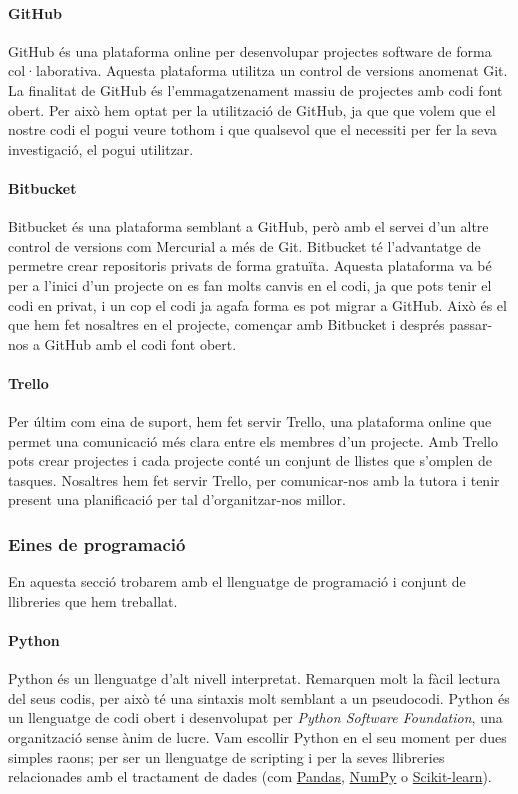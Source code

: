 \documentclass[12pt,a4paper,catalan]{article}
\begin{document}
\paragraph{GitHub}
GitHub és una plataforma online per desenvolupar projectes software de forma col·laborativa. Aquesta plataforma utilitza un control de versions anomenat Git. La finalitat de GitHub és l'emmagatzenament massiu de projectes amb codi font obert. Per això hem optat per la utilització de GitHub, ja que que volem que el nostre codi el pogui veure tothom i que qualsevol que el necessiti per fer la seva investigació, el pogui utilitzar.

\paragraph{Bitbucket}
Bitbucket és una plataforma semblant a GitHub, però amb el servei d'un altre control de versions com Mercurial a més de Git. Bitbucket té l'advantatge de permetre crear repositoris privats de forma gratuïta. Aquesta plataforma va bé per a l'inici d'un projecte on es fan molts canvis en el codi, ja que pots tenir el codi en privat, i un cop el codi ja agafa forma es pot migrar a GitHub. Això és el que hem fet nosaltres en el projecte, començar amb Bitbucket i després passar-nos a GitHub amb el codi font obert.

\paragraph{Trello}
Per últim com eina de suport, hem fet servir Trello, una plataforma online que permet una comunicació més clara entre els membres d'un projecte. Amb Trello pots crear projectes i cada projecte conté un conjunt de llistes que s'omplen de tasques. Nosaltres hem fet servir Trello, per comunicar-nos amb la tutora i tenir present una planificació per tal d'organitzar-nos millor.

\newpage
\subsubsection{Eines de programació}
En aquesta secció trobarem amb el llenguatge de programació i conjunt de llibreries que hem treballat.

\paragraph{Python}
Python és un llenguatge d'alt nivell interpretat. Remarquen molt la fàcil lectura del seus codis, per això té una sintaxis molt semblant a un pseudocodi. Python és un llenguatge de codi obert i desenvolupat per \textit{Python Software Foundation}, una organització sense ànim de lucre. Vam escollir Python en el seu moment per dues simples raons; per ser un llenguatge de scripting i per la seves llibreries relacionades amb el tractament de dades (com \hyperlink{pandas}{Pandas}, \hyperlink{numpy}{NumPy} o \hyperlink{sklearn}{Scikit-learn}).
\end{document}
